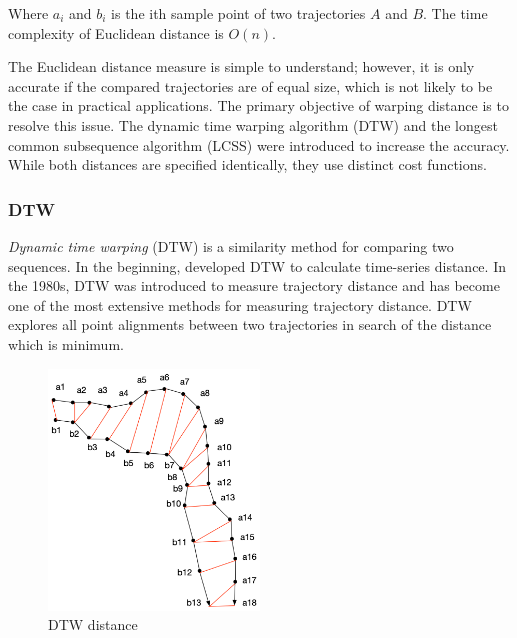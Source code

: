 \documentclass[a4paper, 12pt]{article}
\begin{document}
Where $a_{i}$ and $b_{i}$ is the ith sample point of two trajectories $A$ and $B$. The time complexity of Euclidean distance is $O(n)$. 

The Euclidean distance measure is simple to understand; however, it is only accurate if the compared trajectories are of equal size, which is not likely to be the case in practical applications. The primary objective of warping distance is to resolve this issue. The dynamic time warping algorithm (DTW) \citep{kruskal1983overview} and the longest common subsequence algorithm (LCSS) \citep{kearney1990stream} were introduced to increase the accuracy. While both distances are specified identically, they use distinct cost functions.

\subsubsection{DTW}
\textit{Dynamic time warping} (DTW) is a similarity method for comparing two sequences. In the beginning, \cite{myers1980performance} developed DTW to calculate time-series distance. In the 1980s, DTW was introduced to measure trajectory distance \citep{kruskal1983overview} and has become one of the most extensive methods for measuring trajectory distance. DTW explores all point alignments between two trajectories in search of the distance which is minimum. 

\begin{figure}[ht]
    \centering
    \includegraphics[width=0.5\textwidth]{DTW.png}
    \caption{DTW distance}
    \label{fig5}
\end{figure}
\end{document}
